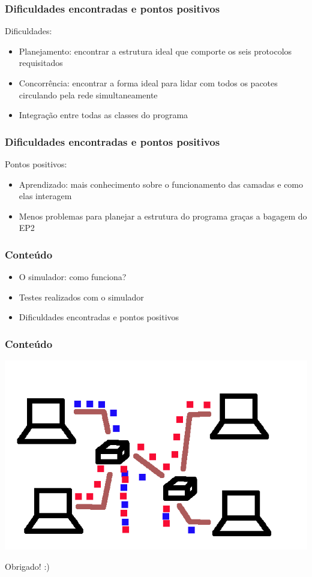 \documentclass{beamer}
\begin{document}
\begin{frame}
	\frametitle{Dificuldades encontradas e pontos positivos}
	Dificuldades:
	\begin{itemize}
		\item Planejamento: encontrar a estrutura ideal que comporte os seis protocolos requisitados
		\item Concorrência: encontrar a forma ideal para lidar com todos os pacotes circulando pela rede simultaneamente
		\item Integração entre todas as classes do programa
	\end{itemize}
\end{frame}

\begin{frame}
	\frametitle{Dificuldades encontradas e pontos positivos}
	Pontos positivos:
	\begin{itemize}
		\item Aprendizado: mais conhecimento sobre o funcionamento das camadas e como elas interagem
		\item Menos problemas para planejar a estrutura do programa graças a bagagem do EP2
	\end{itemize}
\end{frame}

\begin{frame}
	\frametitle{Conteúdo}
	\begin{itemize}
		\item \textcolor{covered}{O simulador: como funciona?}
		\item \textcolor{covered}{Testes realizados com o simulador}
		\item \textcolor{covered}{Dificuldades encontradas e pontos positivos}
	\end{itemize}
\end{frame}

\begin{frame}
	\frametitle{Conteúdo}
	\begin{center}
	\includegraphics[scale=0.3]{simulator2.png}
	\end{center}
	\begin{center}
	Obrigado! :)
	\end{center}

\end{frame}
\end{document}
